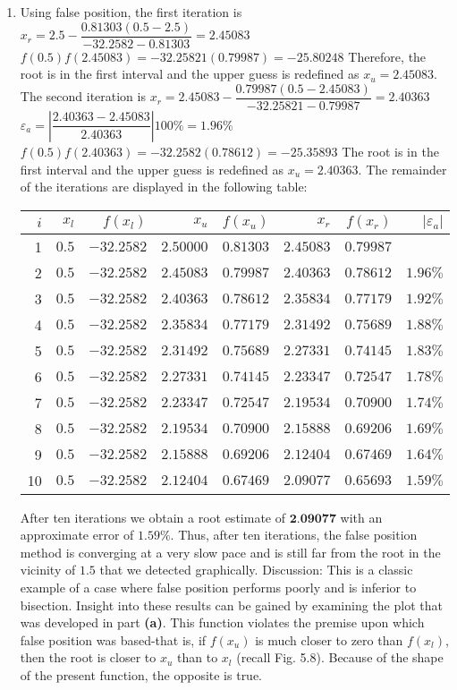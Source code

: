 \documentclass[../main.tex]{subfiles}
\begin{document}
\begin{enumerate}[label=\bfseries(\alph*)]
\item Using false position, the first iteration is
\bigbreak
$x_{r}=2.5-\dfrac{0.81303(0.5-2.5)}{-32.2582-0.81303}=2.45083$
\bigbreak
$f(0.5) f(2.45083)=-32.25821(0.79987)=-25.80248$
\bigbreak
Therefore, the root is in the first interval and the upper guess is redefined as $x_{u}=2.45083$. The second iteration is
\bigbreak
$x_{r}=2.45083-\dfrac{0.79987(0.5-2.45083)}{-32.25821-0.79987}=2.40363$
\bigbreak
$\varepsilon_{a}=\left|\dfrac{2.40363-2.45083}{2.40363}\right| 100 \%=1.96 \%$
\bigbreak
$f(0.5) f(2.40363)=-32.2582(0.78612)=-25.35893$
\bigbreak
The root is in the first interval and the upper guess is redefined as $x_{u}=2.40363$. The remainder of the iterations are displayed in the following table:
\bigbreak
\begin{tabular}{|r|r|r|r|r|r|r|r|}
\hline
$i$ & $x_{l}$ & $f\left(x_{l}\right)$ & $x_{u}$ & $f\left(x_{u}\right)$ & $x_{r}$ & $f\left(x_{r}\right)$ & $\left|\varepsilon_{a}\right|$ \\
\hline
1 & $0.5$ & $-32.2582$ & $2.50000$ & $0.81303$ & $2.45083$ & $0.79987$ &  \\
\hline
2 & $0.5$ & $-32.2582$ & $2.45083$ & $0.79987$ & $2.40363$ & $0.78612$ & $1.96 \%$ \\
\hline
3 & $0.5$ & $-32.2582$ & $2.40363$ & $0.78612$ & $2.35834$ & $0.77179$ & $1.92 \%$ \\
\hline
4 & $0.5$ & $-32.2582$ & $2.35834$ & $0.77179$ & $2.31492$ & $0.75689$ & $1.88 \%$ \\
\hline
5 & $0.5$ & $-32.2582$ & $2.31492$ & $0.75689$ & $2.27331$ & $0.74145$ & $1.83 \%$ \\
\hline
6 & $0.5$ & $-32.2582$ & $2.27331$ & $0.74145$ & $2.23347$ & $0.72547$ & $1.78 \%$ \\
\hline
7 & $0.5$ & $-32.2582$ & $2.23347$ & $0.72547$ & $2.19534$ & $0.70900$ & $1.74 \%$ \\
\hline
8 & $0.5$ & $-32.2582$ & $2.19534$ & $0.70900$ & $2.15888$ & $0.69206$ & $1.69 \%$ \\
\hline
9 & $0.5$ & $-32.2582$ & $2.15888$ & $0.69206$ & $2.12404$ & $0.67469$ & $1.64 \%$ \\
\hline
10 & $0.5$ & $-32.2582$ & $2.12404$ & $0.67469$ & $2.09077$ & $0.65693$ & $1.59 \%$ \\
\hline
\end{tabular}
\bigbreak

After ten iterations we obtain a root estimate of $\mathbf{2 . 0 9 0 7 7}$ with an approximate error of $1.59 \%$. Thus, after ten iterations, the false position method is converging at a very slow pace and is still far from the root in the vicinity of $1.5$ that we detected graphically.
\bigbreak
Discussion: This is a classic example of a case where false position performs poorly and is inferior to bisection. Insight into these results can be gained by examining the plot that was developed in part \textbf{(a)}. This function violates the premise upon which false position was based-that is, if $f\left(x_{u}\right)$ is much closer to zero than $f\left(x_{l}\right)$, then the root is closer to $x_{u}$ than to $x_{l}$ (recall Fig. 5.8). Because of the shape of the present function, the opposite is true.

\end{enumerate}
\end{document}
